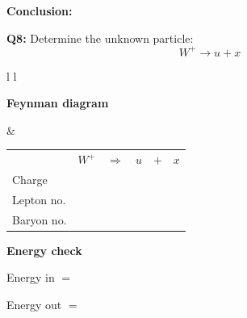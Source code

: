 \documentclass[12pt]{article}
\begin{document}
\vspace{0.5cm}

\textbf{Conclusion:}

\vspace{2.5cm}

\newpage
\textbf{Q8:} Determine the unknown particle:
\[
W^+ \rightarrow u + x
\]

\vspace{0.5cm}

\begin{tabular}{l l}

\begin{minipage}[t]{0.46\textwidth}
\vspace{0pt}
\textbf{Feynman diagram}

\vspace{0.6cm}

\begin{tikzpicture}
\begin{feynman}
  \vertex (W) at (0,2) {};
  \vertex [coordinate] (v) at (3,2) {};

  \vertex (u) at (4,4) {\(u\)};
  \vertex (x) at (5,3) {\(x\)};

  \diagram*{
    (W) -- [boson, edge label=\(W^+\), momentum'={}] (v),
    (v) -- [fermion] (u),
    (v) -- [fermion] (x),
  };
\end{feynman}
\end{tikzpicture}
\end{minipage}
&
\begin{minipage}[t]{0.50\textwidth}
\vspace{0pt}

\renewcommand{\arraystretch}{1.4}
\begin{tabular}{@{}l c c c c c@{}}
 & \(W^+\) & \(\Rightarrow\) & \(u\) & \(+\) & \(x\) \\
Charge &  &  &  &  &  \\
Lepton no. &  &  &  &  &  \\
Baryon no. &  &  &  &  &  \\
\end{tabular}

\vspace{0.6cm}

\textbf{Energy check}

Energy in $=$

Energy out $=$

\end{minipage}

\end{tabular}
\end{document}
